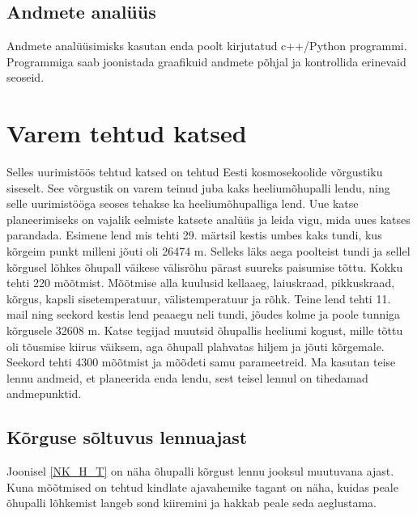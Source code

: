 \documentclass{trkut}%
\begin{document}
\subsection{Andmete analüüs}
Andmete analüüsimisks kasutan enda poolt kirjutatud c++/Python programmi. Programmiga saab joonistada graafikuid andmete põhjal ja kontrollida erinevaid seoseid.

\section{Varem tehtud katsed}
Selles uurimistöös tehtud katsed on tehtud Eesti kosmosekoolide võrgustiku siseselt. See võrgustik on varem teinud juba kaks heeliumõhupalli lendu, ning selle uurimistööga seoses tehakse ka heeliumõhupalliga lend. Uue katse planeerimiseks on vajalik eelmiste katsete analüüs ja leida vigu, mida uues katses parandada.
\newline Esimene lend mis tehti 29. märtsil kestis umbes kaks tundi, kus kõrgeim punkt milleni jõuti oli 26474 m. Selleks läks aega poolteist tundi ja sellel kõrgusel lõhkes õhupall väikese välisrõhu pärast suureks paisumise tõttu. Kokku tehti 220 mõõtmist. Mõõtmise alla kuulusid kellaaeg, laiuskraad, pikkuskraad, kõrgus, kapsli sisetemperatuur, välistemperatuur ja rõhk.
\newline Teine lend tehti 11. mail ning seekord kestis lend peaaegu neli tundi, jõudes kolme ja poole tunniga kõrgusele 32608 m. Katse tegijad muutsid õhupallis heeliumi kogust, mille tõttu oli tõusmise kiirus väiksem, aga õhupall plahvatas hiljem ja jõuti kõrgemale. Seekord tehti 4300 mõõtmist ja mõõdeti samu parameetreid.
\newline Ma kasutan teise lennu andmeid, et planeerida enda lendu, sest teisel lennul on tihedamad andmepunktid.

\subsection{Kõrguse sõltuvus lennuajast}
Joonisel \ref{NK_H_T} on näha õhupalli kõrgust lennu jooksul muutuvana ajast. Kuna mõõtmised on tehtud kindlate ajavahemike tagant on näha, kuidas peale õhupalli lõhkemist langeb sond kiiremini ja hakkab peale seda aeglustama. %
\end{document}
